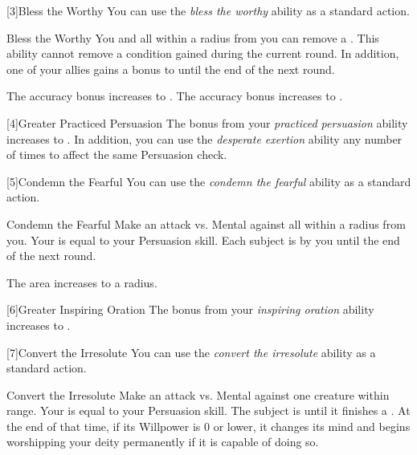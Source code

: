         [3]{Bless the Worthy} You can use the \textit{bless the worthy} ability as a standard action.
        \begin{instantability}{Bless the Worthy}
            You and all  within a \hugearea radius from you can remove a .
            This ability cannot remove a condition gained during the current round.
            In addition, one of your allies gains a  bonus to  until the end of the next round.

            \rankline
             The accuracy bonus increases to .
             The accuracy bonus increases to .
        \end{instantability}

        [4]{Greater Practiced Persuasion} The bonus from your \textit{practiced persuasion} ability increases to .
        In addition, you can use the \textit{desperate exertion} ability any number of times to affect the same Persuasion check.

        [5]{Condemn the Fearful} You can use the \textit{condemn the fearful} ability as a standard action.
        \begin{instantability}{Condemn the Fearful}
            Make an attack vs. Mental against all  within a \medarea radius from you.
            Your  is equal to your Persuasion skill.
            \hit Each subject is \frightened by you until the end of the next round.

            \rankline
             The area increases to a \largearea radius.
        \end{instantability}

        [6]{Greater Inspiring Oration} The bonus from your \textit{inspiring oration} ability increases to .

        [7]{Convert the Irresolute} You can use the \textit{convert the irresolute} ability as a standard action.
        \begin{instantability}{Convert the Irresolute}
            Make an attack vs. Mental against one creature within \rngmed range.
            Your  is equal to your Persuasion skill.
            \hit The subject is  until it finishes a .
            At the end of that time, if its Willpower is 0 or lower, it changes its mind and begins worshipping your deity permanently if it is capable of doing so.
        \end{instantability}

